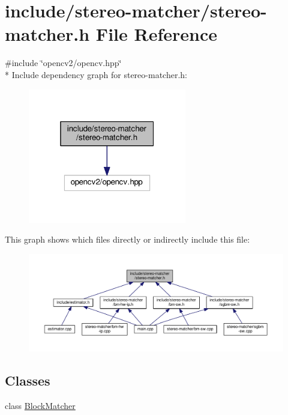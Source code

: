 \hypertarget{stereo-matcher_8h}{}\section{include/stereo-\/matcher/stereo-\/matcher.h File Reference}
\label{stereo-matcher_8h}
{\ttfamily \#include \char`\"{}opencv2/opencv.\+hpp\char`\"{}}\\*
Include dependency graph for stereo-\/matcher.h\+:
\nopagebreak
\begin{figure}[H]
\begin{center}
\leavevmode
\includegraphics[width=196pt]{stereo-matcher_8h__incl}
\end{center}
\end{figure}
This graph shows which files directly or indirectly include this file\+:
\nopagebreak
\begin{figure}[H]
\begin{center}
\leavevmode
\includegraphics[width=350pt]{stereo-matcher_8h__dep__incl}
\end{center}
\end{figure}
\subsection*{Classes}
\begin{DoxyCompactItemize}
\item 
class \hyperlink{classBlockMatcher}{Block\+Matcher}
\end{DoxyCompactItemize}
